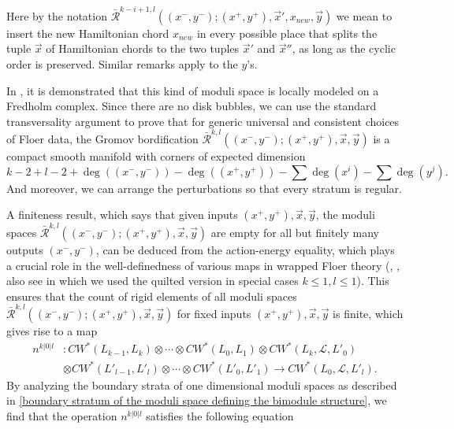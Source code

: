 \documentclass{amsart}
\numberwithin{equation}{section}
\numberwithin{figure}{section}
\begin{document}
Here by the notation $\bar{\mathcal{R}}^{k-i+1, l}((x^{-}, y^{-}); (x^{+}, y^{+}), \vec{x}', x_{new}, \vec{y})$ we mean to insert the new Hamiltonian chord $x_{new}$ in every possible place that splits the tuple $\vec{x}$ of Hamiltonian chords to the two tuples $\vec{x}'$ and $\vec{x}''$, as long as the cyclic order is preserved. Similar remarks apply to the $y$'s. \par
	In \cite{Wehrheim-Woodward4}, it is demonstrated that this kind of moduli space is locally modeled on a Fredholm complex. Since there are no disk bubbles, we can use the standard transversality argument to prove that for generic universal and consistent choices of Floer data, the Gromov bordification $\bar{\mathcal{R}}^{k, l}((x^{-}, y^{-}); (x^{+}, y^{+}), \vec{x}, \vec{y})$ is a compact smooth manifold with corners of expected dimension 
\begin{equation}
	k - 2 + l - 2 + \deg((x^{-}, y^{-})) - \deg((x^{+}, y^{+})) - \sum \deg(x^{i}) - \sum \deg(y^{j}).
\end{equation}
And moreover, we can arrange the perturbations so that every stratum is regular. \par
	A finiteness result, which says that given inputs $(x^{+}, y^{+}), \vec{x}, \vec{y}$, the moduli spaces $\bar{\mathcal{R}}^{k, l}((x^{-}, y^{-}); (x^{+}, y^{+}), \vec{x}, \vec{y})$ are empty for all but finitely many outputs $(x^{-}, y^{-})$, can be deduced from the action-energy equality, which plays a crucial role in the well-definedness of various maps in wrapped Floer theory (\cite{Abouzaid-Seidel}, \cite{Abouzaid1}, also see \cite{Gao1} in which we used the quilted version in special cases $k \le 1, l \le 1$). This ensures that the count of rigid elements of all moduli spaces $\bar{\mathcal{R}}^{k, l}((x^{-}, y^{-}); (x^{+}, y^{+}), \vec{x}, \vec{y})$ for fixed inputs $(x^{+}, y^{+}), \vec{x}, \vec{y}$ is finite, which gives rise to a map
\begin{equation}
\begin{split}
n^{k|0|l}&: CW^{*}(L_{k-1}, L_{k}) \otimes \cdots \otimes CW^{*}(L_{0}, L_{1}) \otimes CW^{*}(L_{k}, \mathcal{L}, L'_{0})\\
&\otimes CW^{*}(L'_{l-1}, L'_{l}) \otimes \cdots \otimes CW^{*}(L'_{0}, L'_{1}) \to CW^{*}(L_{0}, \mathcal{L}, L'_{l}).
\end{split}
\end{equation}
By analyzing the boundary strata of one dimensional moduli spaces as described in \eqref{boundary stratum of the moduli space defining the bimodule structure}, we find that the operation $n^{k|0|l}$ satisfies the following equation
\end{document}
